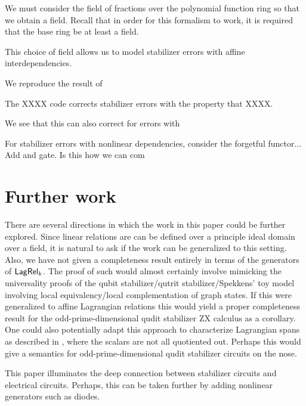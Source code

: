 We must consider the field of fractions over the polynomial function ring so that we obtain a field.  Recall that in order for this formalism to work, it is required that the base ring be at least a field.

This choice of field allows us to model stabilizer errors with affine interdependencies.


We reproduce the result of \cite{???}
\begin{example}
The XXXX code corrects stabilizer errors with the property that XXXX.
\end{example}

We see that this can also correct for errors with 


For stabilizer errors with nonlinear dependencies, consider the forgetful functor...  Add and gate.  Is this how we can com
\section{Further work}

There are several directions in which the work in this paper could be further explored. Since linear relations are can be defined over a principle ideal domain over a field, it is natural to ask if the work can be generalized to this setting. Also, we have not given a completeness result entirely in terms of the generators of $\mathsf{Lag}\mathsf{Rel}_k$. The proof of such would almost certainly involve mimicking the universality proofs of the qubit stabilizer/qutrit stabilizer/Spekkens' toy model \cite{backensstab,backensspek,qutrit} involving local equivalency/local complementation of graph states.  
If this were generalized to affine Lagrangian relations this would yield a proper completeness result for the odd-prime-dimensional qudit stabilizer ZX calculus as a corollary. One could also potentially adapt this approach to characterize Lagrangian spans as described in \cite[p. 187]{fong2016algebra}, where the scalars are not all quotiented out.  Perhaps this would give a semantics for odd-prime-dimensional qudit stabilizer circuits on the nose.

This paper illuminates the deep connection between stabilizer circuits and electrical circuits.  Perhaps, this can be taken further by adding nonlinear generators such as diodes.




